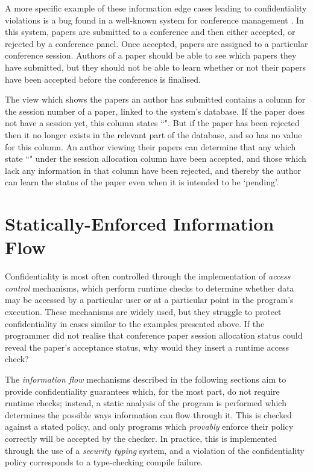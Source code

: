 A more specific example of these information edge cases leading to confidentiality violations is a bug found in a well-known system for conference management \cite{agrawal2016edas_conf}\cite{polikarpova2016lifty}. In this system, papers are submitted to a conference and then either accepted, or rejected by a conference panel. Once accepted, papers are assigned to a particular conference session. Authors of a paper should be able to see which papers they have submitted, but they should not be able to learn whether or not their papers have been accepted before the conference is finalised.

The view which shows the papers an author has submitted contains a column for the session number of a paper, linked to the system's database. If the paper does not have a session yet, this column states ``". But if the paper has been rejected then it no longer exists in the relevant part of the database, and so has no value for this column. An author viewing their papers can determine that any which state ``" under the session allocation column have been accepted, and those which lack any information in that column have been rejected, and thereby the author can learn the status of the paper even when it is intended to be `pending'.

\section{Statically-Enforced Information Flow}

Confidentiality is most often controlled through the implementation of \textit{access control} mechanisms, which perform runtime checks to determine whether data may be accessed by a particular user or at a particular point in the program's execution. These mechanisms are widely used, but they struggle to protect confidentiality in cases similar to the examples presented above. If the programmer did not realise that conference paper session allocation status could reveal the paper's acceptance status, why would they insert a runtime access check?

The \textit{information flow} mechanisms described in the following sections aim to provide confidentiality guarantees which, for the most part, do not require runtime checks; instead, a static analysis of the program is performed which determines the possible ways information can flow through it. This is checked against a stated policy, and only programs which \textit{provably} enforce their policy correctly will be accepted by the checker. In practice, this is implemented through the use of a \textit{security typing} system, and a violation of the confidentiality policy corresponds to a type-checking compile failure.


